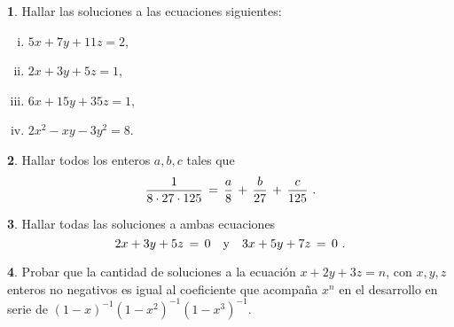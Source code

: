 \theoremstyle{definition}
\newtheorem{ejerLineales}{\ejername}[section]


\begin{ejerLineales}
	Hallar las soluciones a las ecuaciones siguientes:
	\begin{enumerate}[(i)]
		\item $5x+7y+11z=2$,
		\item $2x+3y+5z=1$,
		\item $6x+15y+35z=1$,
		\item $2x^2-xy-3y^2=8$.
	\end{enumerate}
\end{ejerLineales}

\begin{ejerLineales}
	Hallar todos los enteros $a,b,c$ tales que
	\begin{displaymath}
		\frac 1{8\cdot 27\cdot 125}\,=\,
			\frac a 8\,+\,\frac b{27} \,+\,\frac c{125}
		\text{ .}
	\end{displaymath}
\end{ejerLineales}

\begin{ejerLineales}
	Hallar todas las soluciones a ambas ecuaciones
	\begin{displaymath}
		2x+3y+5z\,=\,0\quad\text{y}\quad
			3x+5y+7z\,=\,0
		\text{ .}
	\end{displaymath}
\end{ejerLineales}

\begin{ejerLineales}
	Probar que la cantidad de soluciones a la ecuaci\'on
	$x+2y+3z=n$, con $x,y,z$ enteros no negativos es igual
	al coeficiente que acompa\~na $x^n$ en el desarrollo en serie de
	$(1-x)^{-1}(1-x^2)^{-1}(1-x^3)^{-1}$.
\end{ejerLineales}

